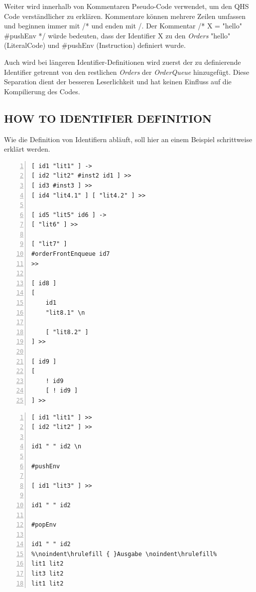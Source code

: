 Weiter wird innerhalb von Kommentaren Pseudo-Code verwendet, um den QHS Code verständlicher zu erklären.
Kommentare können mehrere Zeilen umfassen und beginnen immer mit {\listingFont\selectfont /*} und enden mit {\listingFont\selectfont*/}.
Der Kommentar {\listingFont\selectfont /* X = "hello" { }\#pushEnv */} würde bedeuten,
dass der Identifier {\listingFont\selectfont X} zu den \textit{Orders} {\listingFont\selectfont "hello" { }(LiteralCode)} und {\listingFont\selectfont \#pushEnv (Instruction)} definiert wurde. 

Auch wird bei längeren Identifier-Definitionen wird zuerst der zu definierende Identifier getrennt von den restlichen \textit{Orders} der \textit{OrderQueue} hinzugefügt.
Diese Separation dient der besseren Leserlichkeit und hat keinen Einfluss auf die Kompilierung des Codes.

\subsection{HOW TO IDENTIFIER DEFINITION}
Wie die Definition von Identifiern abläuft, soll hier an einem Beispiel schrittweise erklärt werden.

\begin{lstlisting}[language=QHS, caption=EINGABE BEISPIEL, numbers=left, stepnumber=1]
[ id1 "lit1" ] ->
[ id2 "lit2" #inst2 id1 ] >>
[ id3 #inst3 ] >>
[ id4 "lit4.1" ] [ "lit4.2" ] >>

[ id5 "lit5" id6 ] ->
[ "lit6" ] >>

[ "lit7" ]
#orderFrontEnqueue id7
>>

[ id8 ]
[
    id1
    "lit8.1" \n

    [ "lit8.2" ]
] >>

[ id9 ]
[
    ! id9
    [ ! id9 ]
] >>

\end{lstlisting}

\begin{lstlisting}[language=QHS, caption=ENVIRONMENTS BEISPIEL, numbers=left, stepnumber=1]
%\noindent\hrulefill { }Eingabe \noindent\hrulefill%
[ id1 "lit1" ] >>
[ id2 "lit2" ] >>

id1 " " id2 \n

#pushEnv

[ id1 "lit3" ] >>

id1 " " id2

#popEnv

id1 " " id2
%\noindent\hrulefill { }Ausgabe \noindent\hrulefill%
lit1 lit2
lit3 lit2
lit1 lit2
\end{lstlisting}

